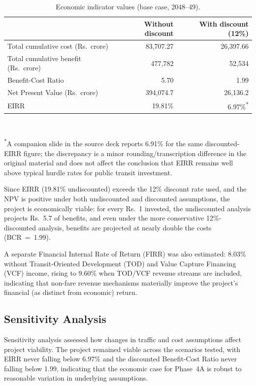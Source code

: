\documentclass[11pt]{article}
\begin{document}
\begin{table}[H]
  \centering
  \caption{Economic indicator values (base case, 2048--49).}
  \label{tab:econindicators}
  \begin{tabular}{@{}lrr@{}}
    \toprule
    & \textbf{Without discount} & \textbf{With discount (12\%)} \\
    \midrule
    Total cumulative cost (Rs.\ crore)    & 83,707.27  & 26,397.66 \\
    Total cumulative benefit (Rs.\ crore) & 477,782    & 52,534 \\
    Benefit-Cost Ratio                    & 5.70       & 1.99 \\
    Net Present Value (Rs.\ crore)        & 394,074.7  & 26,136.2 \\
    EIRR                                  & 19.81\%    & 6.97\%\textsuperscript{*} \\
    \bottomrule
  \end{tabular}
  \\[2pt]
  \raggedright\footnotesize\textsuperscript{*}A companion slide in the source deck reports 6.91\% for
  the same discounted-EIRR figure; the discrepancy is a minor rounding/transcription difference in the
  original material and does not affect the conclusion that EIRR remains well above typical hurdle
  rates for public transit investment.
\end{table}

Since EIRR (19.81\% undiscounted) exceeds the 12\% discount rate used, and the NPV is positive under
both undiscounted and discounted assumptions, the project is economically viable: for every Rs.~1
invested, the undiscounted analysis projects Rs.~5.7 of benefits, and even under the more conservative
12\%-discounted analysis, benefits are projected at nearly double the costs (BCR~=~1.99).

A separate Financial Internal Rate of Return (FIRR) was also estimated: 8.03\% without Transit-Oriented
Development (TOD) and Value Capture Financing (VCF) income, rising to 9.60\% when TOD/VCF revenue
streams are included, indicating that non-fare revenue mechanisms materially improve the project's
financial (as distinct from economic) return.

\subsection{Sensitivity Analysis}
Sensitivity analysis assessed how changes in traffic and cost assumptions affect project viability. The
project remained viable across the scenarios tested, with EIRR never falling below 6.97\% and the
discounted Benefit-Cost Ratio never falling below 1.99, indicating that the economic case for Phase~4A
is robust to reasonable variation in underlying assumptions.
\end{document}
